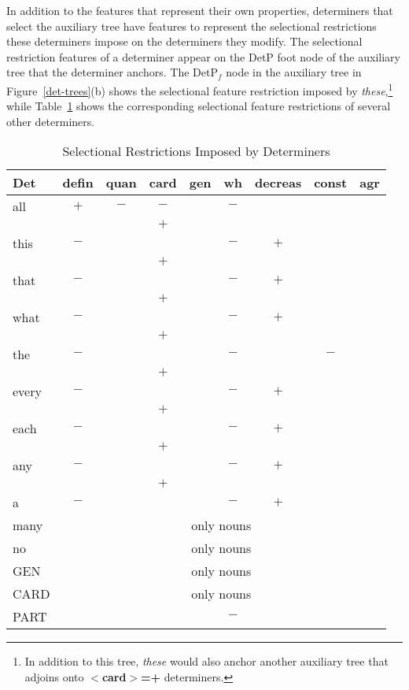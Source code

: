 
In addition to the features that represent their own properties, determiners
that select the auxiliary tree have features to represent the selectional
restrictions these determiners impose on the determiners they modify.  The
selectional restriction features of a determiner appear on the DetP foot node
of the auxiliary tree that the determiner anchors.  The DetP$_{f}$ node in the
auxiliary tree in Figure~\ref{det-trees}(b) shows the selectional feature
restriction imposed by {\it these},\footnote{In addition to this tree, {\it
these} would also anchor another auxiliary tree that adjoins onto {\bf
$<$card$>$=+} determiners.} while Table~\ref{det-ordering} shows the
corresponding selectional feature restrictions of several other determiners.

\begin{table}[hbt]
\vspace*{-2mm}
\centering
\begin{tabular}{|l||c|c|c|c|c|c|c|c|}
\hline
Det&defin&quan&card&gen&wh&decreas&const&agr\\
\hline
\hline
all&$+$&$-$&$-$&&$-$&&&\\
&&&$+$&&&&&\\ \hline
this&$-$&&&&$-$&$+$&&\\
&&&$+$&&&&&\\ \hline
that&$-$&&&&$-$&$+$&&\\
&&&$+$&&&&&\\ \hline
what&$-$&&&&$-$&$+$&&\\
&&&$+$&&&&&\\ \hline
the&$-$&&&&$-$&&$-$&\\ 
&&&$+$&&&&&\\ \hline
every&$-$&&&&$-$&$+$&&\\
&&&$+$&&&&&\\ \hline
each&$-$&&&&$-$&$+$&&\\
&&&$+$&&&&&\\ \hline
any&$-$&&&&$-$&$+$&&\\ 
&&&$+$&&&&&\\ \hline
a&$-$&&&&$-$&$+$&&\\ \hline
many&\multicolumn{8}{c|}{only nouns}\\ \hline
no&\multicolumn{8}{c|}{only nouns}\\ \hline
GEN&\multicolumn{8}{c|}{only nouns}\\ \hline
CARD&\multicolumn{8}{c|}{only nouns}\\ \hline
PART&&&&&$-$&&&\\ \hline
\end{tabular}
\caption{Selectional Restrictions Imposed by Determiners}
\label{det-ordering}
\end{table}

